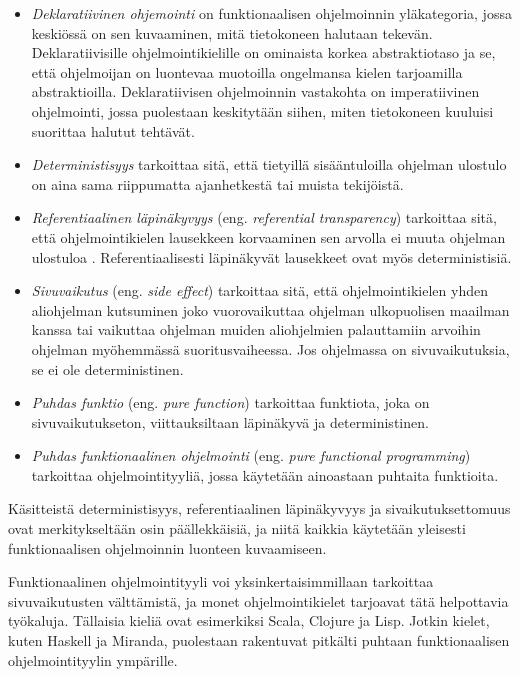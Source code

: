 \begin{itemize}
	\item \textit{Deklaratiivinen ohjemointi} on funktionaalisen ohjelmoinnin yläkategoria, jossa keskiössä on sen kuvaaminen, mitä tietokoneen halutaan tekevän. Deklaratiivisille ohjelmointikielille on ominaista korkea abstraktiotaso ja se, että ohjelmoijan on luontevaa muotoilla ongelmansa kielen tarjoamilla abstraktioilla. Deklaratiivisen ohjelmoinnin vastakohta on imperatiivinen ohjelmointi, jossa puolestaan keskitytään siihen, miten tietokoneen kuuluisi suorittaa halutut tehtävät.

	\item \textit{Deterministisyys} tarkoittaa sitä, että tietyillä sisääntuloilla ohjelman ulostulo on aina sama riippumatta ajanhetkestä tai muista tekijöistä.

	\item \textit{Referentiaalinen läpinäkyvyys} (eng. \textit{referential transparency}) tarkoittaa sitä, että ohjelmointikielen lausekkeen korvaaminen sen arvolla ei muuta ohjelman ulostuloa \citep{hudak1989conception}. Referentiaalisesti läpinäkyvät lausekkeet ovat myös deterministisiä.

	\item \textit{Sivuvaikutus} (eng. \textit{side effect}) tarkoittaa sitä, että ohjelmointikielen yhden aliohjelman kutsuminen joko vuorovaikuttaa ohjelman ulkopuolisen maailman kanssa tai vaikuttaa ohjelman muiden aliohjelmien palauttamiin arvoihin ohjelman myöhemmässä suoritusvaiheessa. Jos ohjelmassa on sivuvaikutuksia, se ei ole deterministinen.

	\item \textit{Puhdas funktio} (eng. \textit{pure function}) tarkoittaa funktiota, joka on sivuvaikutukseton, viittauksiltaan läpinäkyvä ja deterministinen.

	\item \textit{Puhdas funktionaalinen ohjelmointi} (eng. \textit{pure functional programming}) tarkoittaa ohjelmointityyliä, jossa käytetään ainoastaan puhtaita funktioita.
\end{itemize}

Käsitteistä deterministisyys, referentiaalinen läpinäkyvyys ja sivaikutuksettomuus ovat merkitykseltään osin päällekkäisiä, ja niitä kaikkia käytetään yleisesti funktionaalisen ohjelmoinnin luonteen kuvaamiseen.

Funktionaalinen ohjelmointityyli voi yksinkertaisimmillaan tarkoittaa sivuvaikutusten välttämistä, ja monet ohjelmointikielet tarjoavat tätä helpottavia työkaluja. Tällaisia kieliä ovat esimerkiksi Scala, Clojure ja Lisp. Jotkin kielet, kuten Haskell ja Miranda, puolestaan rakentuvat pitkälti puhtaan funktionaalisen ohjelmointityylin ympärille.

